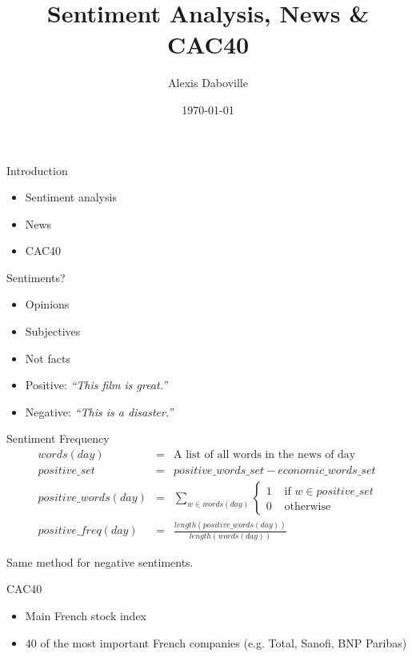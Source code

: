 \documentclass{beamer}
\title{Sentiment Analysis, News \& CAC40}
\author{Alexis Daboville}
\institute{Trinity College Dublin}
\date{\today}
\begin{document}
	\begin{frame}
		\titlepage
	\end{frame}

	\begin{frame}{Introduction}
		\begin{itemize}
			\item Sentiment analysis
			\pause \item News
			\pause \item CAC40
		\end{itemize}
	\end{frame}

	\begin{frame}{Sentiments?}
		\begin{itemize}
			\item Opinions
			\item Subjectives
			\item Not facts
		\end{itemize}

		\pause

		\begin{itemize}
			\item Positive: \emph{``This film is {\color{green}great}.''}
			\item Negative: \emph{``This is a {\color{red}disaster}.''}
		\end{itemize}
	\end{frame}

	\begin{frame}{Sentiment Frequency}
		\begin{eqnarray*}
			words(day) &=& \textrm{A list of all words in the news of day}\\
			positive\_set &=& positive\_words\_set - economic\_words\_set\\
			positive\_words(day) &=& \sum_{w \in words(day)} \begin{cases}1 & \textrm{ if }w \in positive\_set\\ 0 & \mbox{ otherwise }\end{cases}\\
			positive\_freq(day) &=& \frac{length(positive\_words(day))}{length(words(day))}
		\end{eqnarray*}

		\pause

		Same method for negative sentiments.

	\end{frame}

	\begin{frame}{CAC40}
		\begin{itemize}
			\item Main French stock index
			\item 40 of the most important French companies (e.g. Total, Sanofi, BNP Paribas)
		\end{itemize}
	\end{frame}
\end{document}
